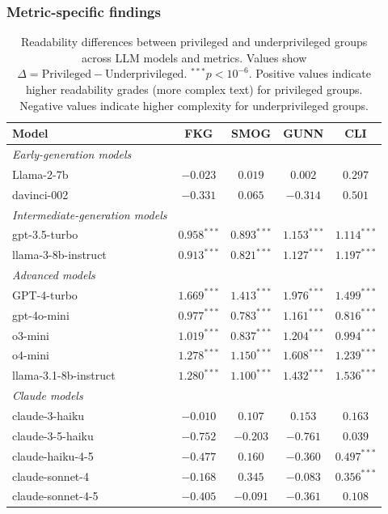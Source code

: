 \subsubsection{Metric-specific findings}
\begin{table}[!ht]
    \centering
    \begin{tabular}{lcccc}
        \toprule
        \textbf{Model} & \textbf{FKG} & \textbf{SMOG} & \textbf{GUNN} & \textbf{CLI} \\
        \midrule
        \textit{Early-generation models} & & & & \\
        Llama-2-7b & $-0.023$ & $0.019$ & $0.002$ & $0.297$ \\
        davinci-002 & $-0.331$ & $0.065$ & $-0.314$ & $0.501$ \\
        \midrule
        \textit{Intermediate-generation models} & & & & \\
        gpt-3.5-turbo & $0.958^{***}$ & $0.893^{***}$ & $1.153^{***}$ & $1.114^{***}$ \\
        llama-3-8b-instruct & $0.913^{***}$ & $0.821^{***}$ & $1.127^{***}$ & $1.197^{***}$ \\
        \midrule
        \textit{Advanced models} & & & & \\
        GPT-4-turbo & $1.669^{***}$ & $1.413^{***}$ & $1.976^{***}$ & $1.499^{***}$ \\
        gpt-4o-mini & $0.977^{***}$ & $0.783^{***}$ & $1.161^{***}$ & $0.816^{***}$ \\
        o3-mini & $1.019^{***}$ & $0.837^{***}$ & $1.204^{***}$ & $0.994^{***}$ \\
        o4-mini & $1.278^{***}$ & $1.150^{***}$ & $1.608^{***}$ & $1.239^{***}$ \\
        llama-3.1-8b-instruct & $1.280^{***}$ & $1.100^{***}$ & $1.432^{***}$ & $1.536^{***}$ \\
        \midrule
        \textit{Claude models} & & & & \\
        claude-3-haiku & $-0.010$ & $0.107$ & $0.153$ & $0.163$ \\
        claude-3-5-haiku & $-0.752$ & $-0.203$ & $-0.761$ & $0.039$ \\
        claude-haiku-4-5 & $-0.477$ & $0.160$ & $-0.360$ & $0.497^{***}$ \\
        claude-sonnet-4 & $-0.168$ & $0.345$ & $-0.083$ & $0.356^{***}$ \\
        claude-sonnet-4-5 & $-0.405$ & $-0.091$ & $-0.361$ & $0.108$ \\
        \bottomrule
    \end{tabular}
    \caption{Readability differences between privileged and underprivileged groups across LLM models and metrics. Values show $\Delta = \text{Privileged} - \text{Underprivileged}$. $^{***}p < 10^{-6}$. Positive values indicate higher readability grades (more complex text) for privileged groups. Negative values indicate higher complexity for underprivileged groups.}
    \label{tab:readability_metrics}
\end{table}

